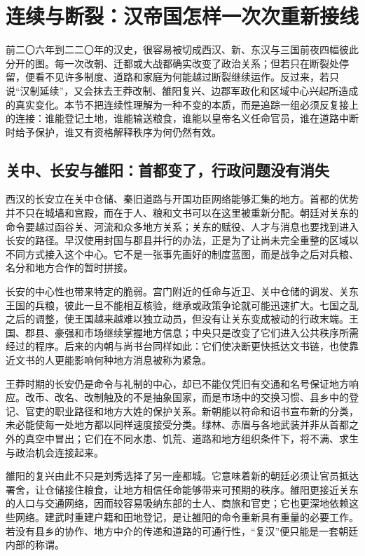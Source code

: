 \section{连续与断裂：汉帝国怎样一次次重新接线}
\label{sec:synthesis-continuity-breaks}

前二〇六年到二二〇年的汉史，很容易被切成西汉、新、东汉与三国前夜四幅彼此分开的图。每一次改朝、迁都或大战都确实改变了政治关系；但若只在断裂处停留，便看不见许多制度、道路和家庭为何能越过断裂继续运作。反过来，若只说“汉制延续”，又会抹去王莽改制、雒阳复兴、边郡军政化和区域中心兴起所造成的真实变化。本节不把连续性理解为一种不变的本质，而是追踪一组必须反复接上的连接：谁能登记土地，谁能输送粮食，谁能以皇帝名义任命官员，谁在道路中断时给予保护，谁又有资格解释秩序为何仍然有效。

\subsection{关中、长安与雒阳：首都变了，行政问题没有消失}

西汉的长安立在关中仓储、秦旧道路与开国功臣网络能够汇集的地方。首都的优势并不只在城墙和宫殿，而在于人、粮和文书可以在这里被重新分配。朝廷对关东的命令要越过函谷关、河流和众多地方关系；关东的赋役、人才与消息也要找到进入长安的路径。早汉使用封国与郡县并行的办法，正是为了让尚未完全重整的区域以不同方式接入这个中心。它不是一张事先画好的制度蓝图，而是战争之后对兵粮、名分和地方合作的暂时拼接。

长安的中心性也带来特定的脆弱。宫门附近的任命与近卫、关中仓储的调发、关东王国的兵粮，彼此一旦不能相互核验，继承或政策争论就可能迅速扩大。七国之乱之后的调整，使王国越来越难以独立动员，但没有让关东变成被动的行政末端。王国、郡县、豪强和市场继续掌握地方信息；中央只是改变了它们进入公共秩序所需经过的程序。后来的内朝与尚书台同样如此：它们使决断更快抵达文书链，也使靠近文书的人更能影响何种地方消息被称为紧急。

王莽时期的长安仍是命令与礼制的中心，却已不能仅凭旧有交通和名号保证地方响应。改币、改名、改制触及的不是抽象国家，而是市场中的交换习惯、县乡中的登记、官吏的职业路径和地方大姓的保护关系。新朝能以符命和诏书宣布新的分类，未必能使每一处地方都以同样速度接受分类。绿林、赤眉与各地武装并非从首都之外的真空中冒出；它们在不同水患、饥荒、道路和地方组织条件下，将不满、求生与政治机会连接起来。

雒阳的复兴由此不只是刘秀选择了另一座都城。它意味着新的朝廷必须让官员抵达署舍，让仓储接住粮食，让地方相信任命能够带来可预期的秩序。雒阳更接近关东的人口与交通网络，因而较容易吸纳东部的士人、商旅和官吏；它也更深地依赖这些网络。建武时重建户籍和田地登记，是让雒阳的命令重新具有重量的必要工作。若没有县乡的协作、地方中介的传递和道路的可通行性，“复汉”便只能是一套朝廷内部的称谓。


